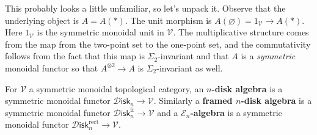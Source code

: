 \documentclass{amsart}
\newcommand{\Disk}{\mathscr{D}\mathsf{isk}_n}
\newcommand{\Diskf}{\mathscr{D}\mathsf{isk}_n^\text{fr}}
\newcommand{\Diskr}{\mathscr{D}\mathsf{isk}_n^\text{rect}}
\begin{document}
This probably looks a little unfamiliar, so let's unpack it. Observe that the
underlying object is $A=A(*)$. The unit morphism is
$A(\varnothing)=1_{\mathcal{V}}\to A(*)$. Here $1_{\mathcal{V}}$ is the symmetric monoidal unit in $\mathcal{V}$.
The multiplicative structure comes from the map from the two-point set to the one-point
set, and the commutativity follows from the fact that this map is $\Sigma_2$-invariant
and that $A$ is a \textit{symmetric} monoidal functor so that $A^{\otimes 2}\to A$ is
$\Sigma_2$-invariant as well.


\begin{definition}
    For $\mathcal{V}$ a symmetric monoidal topological category, an \textbf{$n$-disk algebra}
    is a symmetric monoidal functor $\Disk\to \mathcal{V}$. Similarly a \textbf{framed $n$-disk algebra}
    is a symmetric monoidal functor $\Diskf\to\mathcal{V}$ and a \textbf{$\mathcal{E}_n$-algebra}
    is a symmetric monoidal functor $\Diskr\to\mathcal{V}$.
\end{definition}
\end{document}
